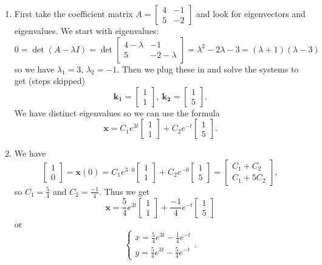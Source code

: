 \documentclass[12pt]{amsart}
\numberwithin{equation}{section}
\theoremstyle{plain} %
\theoremstyle{definition}
\theoremstyle{remark}
\begin{document}
\begin{framed}
\begin{enumerate}
\item
First take the coefficient matrix $A= \begin{bmatrix} 4 & -1 \\ 5 & -2\end{bmatrix}$ and look for eigenvectors and eigenvalues. We start with eigenvalues:
\[ 0= \det (A-\lambda I ) = \det\begin{bmatrix} 4-\lambda & -1 \\ 5 & -2-\lambda \end{bmatrix} = \lambda^2-2\lambda-3 = (\lambda+1)(\lambda-3)\]
so we have $\lambda_1=3$, $\lambda_2 = -1$. Then we plug these in and solve the systems to get (steps skipped)
\[ \mathbf{k_1} = \begin{bmatrix} 1 \\ 1\end{bmatrix}, \  \mathbf{k_2} = \begin{bmatrix} 1 \\ 5\end{bmatrix}.\]
We have distinct eigenvalues so we can use the formula
\[ \mathbf{x} = C_1 e^{3t} \begin{bmatrix} 1 \\ 1\end{bmatrix} + C_2 e^{-t} \begin{bmatrix} 1 \\ 5\end{bmatrix}.\]
\item We have
\[ \begin{bmatrix} 1 \\ 0\end{bmatrix} = \mathbf{x}(0) = C_1 e^{3 \cdot 0} \begin{bmatrix} 1 \\ 1\end{bmatrix} + C_2 e^{-0} \begin{bmatrix} 1 \\ 5\end{bmatrix} = \begin{bmatrix} C_1 + C_2 \\ C_1 + 5C_2\end{bmatrix},\]
so $C_1 = \frac{5}{4}$ and $C_2 = \frac{-1}{4}$. Thus we get
\[  \mathbf{x} = \frac{5}{4} e^{3t} \begin{bmatrix} 1 \\ 1\end{bmatrix} +  \frac{-1}{4} e^{-t} \begin{bmatrix} 1 \\ 5\end{bmatrix}\]
or
\[\begin{cases} x =  \frac{5}{4} e^{3t} -  \frac{1}{4} e^{-t}\\
y =  \frac{5}{4} e^{3t} -  \frac{5}{4} e^{-t}\end{cases}.\]
\end{enumerate}
\end{framed}
\end{document}
